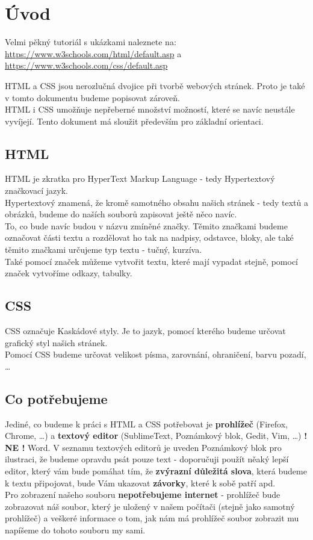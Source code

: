 \section{Úvod}
Velmi pěkný tutoriál s ukázkami naleznete na: \url{https://www.w3schools.com/html/default.asp} a \url{https://www.w3schools.com/css/default.asp}\\

\vspace{0.5cm}

HTML a CSS jsou nerozlučná dvojice při tvorbě webových stránek. Proto je také v tomto dokumentu budeme popisovat zároveň. \\

HTML i CSS umožňuje nepřeberné množství možností, které se navíc neustále vyvíjejí. Tento dokument má sloužit především pro základní orientaci.

\subsection{HTML}
HTML je zkratka pro HyperText Markup Language - tedy Hypertextový značkovací jazyk.\\
Hypertextový znamená, že kromě samotného obsahu našich stránek - tedy textů a obrázků, budeme do naších souborů zapisovat ještě něco navíc.\\
To, co bude navíc budou v názvu zmíněné značky. Těmito značkami budeme označovat části textu a rozdělovat ho tak na nadpisy, odstavce, bloky, ale také těmito značkami určujeme typ textu - tučný, kurzíva.\\
Také pomocí značek můžeme vytvořit  textu, které mají vypadat stejně, pomocí značek vytvoříme odkazy, tabulky.

\subsection{CSS}
CSS označuje Kaskádové styly. Je to jazyk, pomocí kterého budeme určovat grafický styl našich stránek.\\
Pomocí CSS budeme určovat velikost písma, zarovnání, ohraničení, barvu pozadí, \dots

\subsection{Co potřebujeme}
Jediné, co budeme k práci s HTML a CSS potřebovat je \textbf{prohlížeč} (Firefox, Chrome, \dots) a \textbf{textový editor} (SublimeText, Poznámkový blok, Gedit, Vim, \dots) \textbf{! NE !} Word. V seznamu textových editorů je uveden Poznámkový blok pro ilustraci, že budeme opravdu psát pouze text - doporučuji použít něaký lepší editor, který vám bude pomáhat tím, že \textbf{zvýrazní důležitá slova}, která budeme k textu připojovat, bude Vám ukazovat \textbf{závorky}, které k sobě patří apd.\\
Pro zobrazení našeho souboru \textbf{nepotřebujeme internet} - prohlížeč bude zobrazovat náš soubor, který je uložený v našem počítači (stejně jako samotný prohlížeč) a veškeré informace o tom, jak nám má prohlížeč soubor zobrazit mu napíšeme do tohoto souboru my sami.